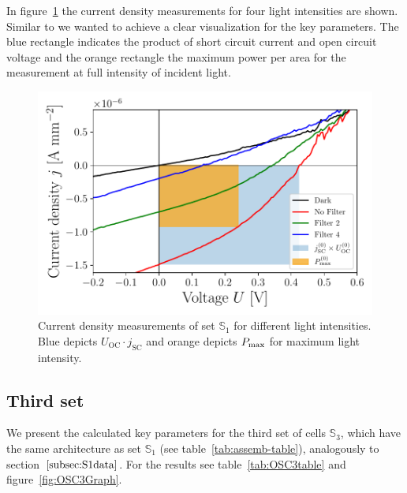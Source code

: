 \documentclass[a4paper,10pt,twocolumn]{article}
\begin{document}
\begin{extract*}
In figure~\ref{fig:OSC1Graph} the current density measurements for four light intensities are shown. Similar to \cite{source1} we wanted to achieve a clear visualization for the key parameters. The blue rectangle indicates the product of short circuit current and open circuit voltage and the orange rectangle the maximum power per area for the measurement at full intensity of incident light.

\begin{figure}[ht]\centering
	\includegraphics[width=\columnwidth]{../../../IV-Curve-Analysis/OSC1Graph.pdf}
	\caption{Current density measurements of set $\mathbb{S}_1$ for different light intensities. Blue depicts $U_{\mathrm{OC}}\!\cdot\!j_{\mathrm{SC}}$ and orange depicts $P_{\text{max}}$ for maximum light intensity.}
	\label{fig:OSC1Graph}
\end{figure}

\subsection{Third set}

We present the calculated key parameters for the third set of cells $\mathbb{S}_3$, which have the same architecture as set $\mathbb{S}_1$ (see table~\ref{tab:assemb-table}), analogously to section~$\ref{subsec:S1data}$. For the results see table~\ref{tab:OSC3table} and figure~\ref{fig:OSC3Graph}.


\end{extract*}
\end{document}
